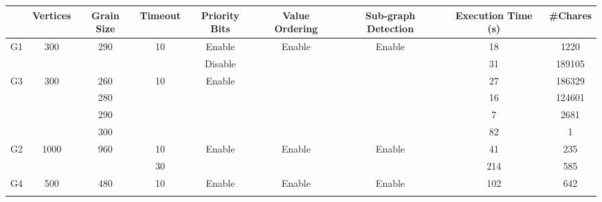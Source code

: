 \documentclass[10pt,twoside]{article}
\begin{document}
\begin{table}[t]
  \scalebox{0.8} {
    \begin{tabular}{|c|c|c|c|c|c|c|c|c|}
    \hline
                        & Vertices              & Grain Size           & Timeout             & Priority Bits           & Value Ordering          & Sub-graph Detection     & Execution Time (s) & \#Chares \\ \hline
    \multirow{2}{*}{G1} & \multirow{2}{*}{300}  & \multirow{2}{*}{290} & \multirow{2}{*}{10} & Enable                  & \multirow{2}{*}{Enable} & \multirow{2}{*}{Enable} & 18                 & 1220     \\ \cline{5-5} \cline{8-9} 
                        &                       &                      &                     & Disable                 &                         &                         & 31                 & 189105   \\ \hline
    \multirow{4}{*}{G3} & \multirow{4}{*}{300}  & 260                  & \multirow{4}{*}{10} & \multirow{4}{*}{Enable} & \multirow{4}{*}{}       & \multirow{4}{*}{}       & 27                 & 186329   \\ \cline{3-3} \cline{8-9} 
                        &                       & 280                  &                     &                         &                         &                         & 16                 & 124601   \\ \cline{3-3} \cline{8-9} 
                        &                       & 290                  &                     &                         &                         &                         & 7                  & 2681     \\ \cline{3-3} \cline{8-9} 
                        &                       & 300                  &                     &                         &                         &                         & 82                 & 1        \\ \hline
    \multirow{2}{*}{G2} & \multirow{2}{*}{1000} & \multirow{2}{*}{960} & 10                  & \multirow{2}{*}{Enable} & \multirow{2}{*}{Enable} & \multirow{2}{*}{Enable} & 41                 & 235      \\ \cline{4-4} \cline{8-9} 
                        &                       &                      & 30                  &                         &                         &                         & 214                & 585      \\ \hline
    \multirow{2}{*}{G4} & \multirow{2}{*}{500}  & \multirow{2}{*}{480} & \multirow{2}{*}{10} & \multirow{2}{*}{Enable} & Enable                  & \multirow{2}{*}{Enable} & 102                & 642      \\ \cline{6-6} \cline{8-9} 

\end{tabular}}
\end{table}
\end{document}
